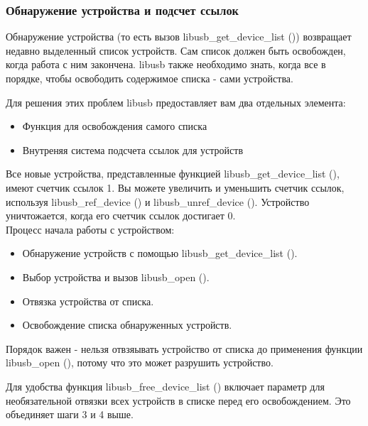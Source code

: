 \documentclass[14pt,a4paper]{article}
\begin{document}
\subsubsection{Обнаружение устройства и подсчет ссылок}
Обнаружение устройства (то есть вызов libusb\_get\_device\_list ()) возвращает недавно выделенный список устройств. Сам список должен быть освобожден, когда работа с ним закончена. libusb также необходимо знать, когда все в порядке, чтобы освободить содержимое списка - сами устройства.\\

\par Для решения этих проблем libusb предоставляет вам два отдельных элемента:
\begin{itemize}
    \item Функция для освобождения самого списка
    \item Внутреняя система подсчета ссылок для устройств 
\end{itemize}

\par Все новые устройства, представленные функцией libusb\_get\_device\_list (), имеют счетчик ссылок 1. Вы можете увеличить и уменьшить счетчик ссылок, используя libusb\_ref\_device () и libusb\_unref\_device (). Устройство уничтожается, когда его счетчик ссылок достигает 0.\\

Процесс начала работы с устройством:

\begin{itemize}
    \item Обнаружение устройств с помощью libusb\_get\_device\_list ().
    \item Выбор устройства и вызов libusb\_open ().
    \item Отвязка устройства от списка.
    \item Освобождение списка обнаруженных устройств.
\end{itemize}

\par Порядок важен - нельзя отвзяывать устройство от списка до применения функции libusb\_open (), потому что это может разрушить устройство.\\

\par Для удобства функция libusb\_free\_device\_list () включает параметр для необязательной отвязки всех устройств в списке перед его освобождением. Это объединяет шаги 3 и 4 выше.\\
\end{document}
